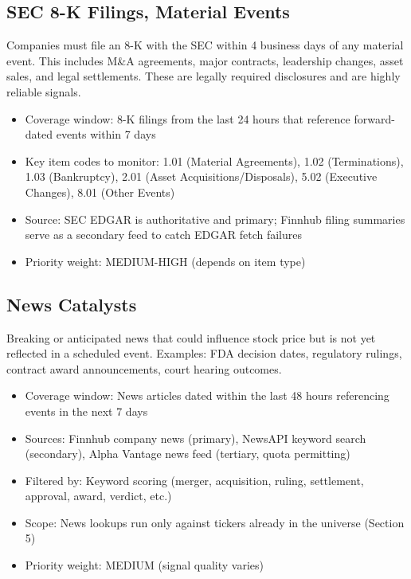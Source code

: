 \documentclass[11pt]{article}
\begin{document}
\subsection{SEC 8-K Filings, Material Events}
Companies must file an 8-K with the SEC within 4 business days of any material event. This includes M\&A agreements, major contracts, leadership changes, asset sales, and legal settlements. These are legally required disclosures and are highly reliable signals.
\begin{itemize}
  \item Coverage window: 8-K filings from the last 24 hours that reference forward-dated events within 7 days
  \item Key item codes to monitor: 1.01 (Material Agreements), 1.02 (Terminations), 1.03 (Bankruptcy), 2.01 (Asset Acquisitions/Disposals), 5.02 (Executive Changes), 8.01 (Other Events)
  \item Source: SEC EDGAR is authoritative and primary; Finnhub filing summaries serve as a secondary feed to catch EDGAR fetch failures
  \item Priority weight: MEDIUM-HIGH (depends on item type)
\end{itemize}

\subsection{News Catalysts}\label{sec:news}
Breaking or anticipated news that could influence stock price but is not yet reflected in a scheduled event. Examples: FDA decision dates, regulatory rulings, contract award announcements, court hearing outcomes.
\begin{itemize}
  \item Coverage window: News articles dated within the last 48 hours referencing events in the next 7 days
  \item Sources: Finnhub company news (primary), NewsAPI keyword search (secondary), Alpha Vantage news feed (tertiary, quota permitting)
  \item Filtered by: Keyword scoring (merger, acquisition, ruling, settlement, approval, award, verdict, etc.)
  \item Scope: News lookups run only against tickers already in the universe (Section 5)
  \item Priority weight: MEDIUM (signal quality varies)
\end{itemize}

\end{document}
